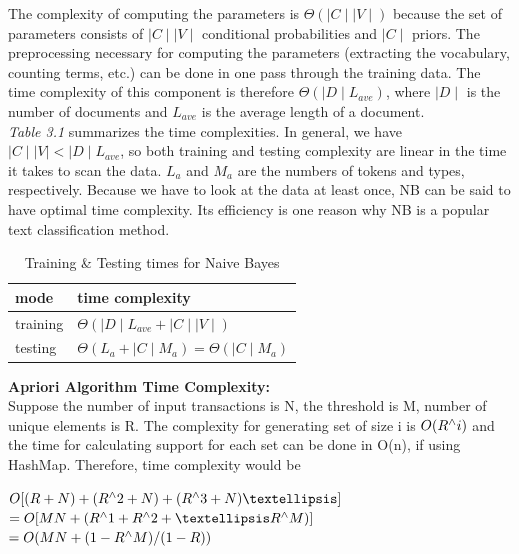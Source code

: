 \documentclass[12pt]{extreport}
\begin{document}
The complexity of computing the parameters is  
$\Theta(\mid C \mid \mid V\mid)$ because the set of parameters consists of $\mid C \mid \mid V\mid$ conditional probabilities and $\mid C \mid$ priors. The preprocessing necessary for computing the parameters (extracting the vocabulary, counting terms, etc.) can be done in one pass through the training data. The time complexity of this component is therefore $\Theta(\mid D \mid L_{ave})$, where $\mid D \mid$ is the number of documents and $ L_{ave}$ is the average length of a document.\\

\newpage
\textit{Table 3.1} summarizes the time complexities. In general, we have\\
$\mid C \mid \mid V\mid < \mid D \mid L_{ave}$, so both training and testing complexity are linear in the time it takes to scan the data.  $ L_{a}$ and $ M_{a}$ are the numbers of tokens and types, respectively. Because we have to look at the data at least once, NB can be said to have optimal time complexity. Its efficiency is one reason why NB is a popular text classification method.\\

\begin{table}[ht]
\caption{Training \& Testing times for Naive Bayes}
\centering
\begin{tabular}{ |M{4cm}|p{7cm}|  }
 \hline
 mode & time complexity \\
 \hline
 training & $\Theta(\mid D \mid L_{ave} + \mid C \mid \mid V \mid)$\\
 \hline 
 testing & $\Theta(L_{a} + \mid C \mid M_a)=\Theta(\mid C \mid M_a)$\\
 \hline
 
 \end{tabular}

\end{table}
\vspace*{1cm}
\noindent
\textbf{Apriori Algorithm Time Complexity:}\\

Suppose the number of input transactions is N, the threshold is M, number of unique elements is R. The complexity for generating set of size i is $O(R\textsuperscript{$\wedge$}i)$ and the time for calculating support for each set can be done in O(n), if using HashMap. Therefore,  time complexity would be\\
\begin{center}
$O[(R + N) + (R\textsuperscript{$\wedge$}2 + N)  + (R\textsuperscript{$\wedge$}3 + N)  …] $\\
$= O[MN + (R\textsuperscript{$\wedge$}1+R\textsuperscript{$\wedge$}2+ … R\textsuperscript{$\wedge$}M)] $\\
$= O(MN+ (1-R\textsuperscript{$\wedge$}M)/(1-R))$
\end{center}
\end{document}
